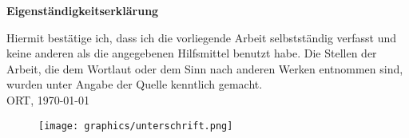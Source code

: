 \thispagestyle{empty} %

\vspace*{0.5cm}
\noindent\large{\textbf{Eigenständigkeitserklärung}} 
\vspace{1cm}\noindent \\
\normalsize

\noindent Hiermit bestätige ich, dass ich die vorliegende Arbeit selbstständig verfasst und keine anderen als die angegebenen Hilfsmittel benutzt habe. Die Stellen der Arbeit, die dem
Wortlaut oder dem Sinn nach anderen Werken entnommen sind, wurden unter 
Angabe der Quelle kenntlich gemacht.
\vspace*{0.5cm}\noindent \\

\noindent ORT, \myformat\today 

\begin{figure}[H]
    \texttt{[image: graphics/unterschrift.png]}
\end{figure}

